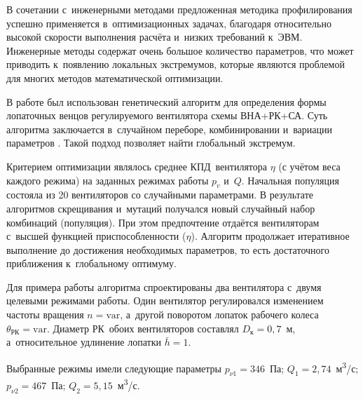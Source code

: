 \begin{enumerate}
В сочетании с~инженерными методами предложенная методика профилирования успешно применяется в~оптимизационных задачах, благодаря относительно высокой скорости выполнения расчёта и~низких требований к~ЭВМ.
Инженерные методы содержат очень большое количество параметров, что может приводить к~появлению локальных экстремумов, которые являются проблемой для многих методов математической оптимизации.

В работе \autocite{Zamolodchikov2022} был использован генетический алгоритм для определения формы лопаточных венцов регулируемого вентилятора схемы ВНА+РК+СА.
Суть алгоритма заключается в~случайном переборе, комбинировании и~вариации параметров \autocite{Holland1992}.
Такой подход позволяет найти глобальный экстремум.

Критерием оптимизации являлось среднее КПД~вентилятора \(\eta\) (с учётом веса каждого режима) на заданных режимах работы \(p_v\) и~\(Q\).
Начальная популяция состояла из 20 вентиляторов со случайными параметрами.
В результате алгоритмов скрещивания и~мутаций получался новый случайный набор комбинаций (популяция).
При этом предпочтение отдаётся вентиляторам с~высшей функцией приспособленности (\(\eta\)).
Алгоритм продолжает итеративное выполнение до достижения необходимых параметров, то есть достаточного приближения к~глобальному оптимуму.

Для примера работы алгоритма спроектированы два вентилятора с~двумя целевыми режимами работы.
Один вентилятор регулировался изменением частоты вращения \(n=\text{var}\), а~другой поворотом лопаток рабочего колеса \(\theta_\text{РК}=\text{var}\).
Диаметр РК~обоих вентиляторов составлял \(D_\text{к}=0,7\)~м, а~относительное удлинение лопатки \(\bar{h}=1\).

Выбранные режимы имели следующие параметры \(p_{\nu 1}=346\)~Па; \(Q_1=2,74\)~м\textsuperscript{3}/с; \(p_{\nu 2}=467\)~Па; \(Q_2 = 5,15\)~м\textsuperscript{3}/с.


\end{enumerate}
